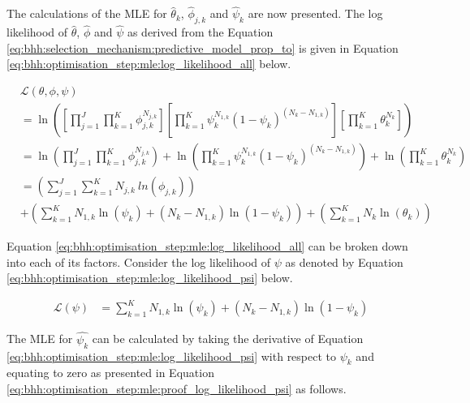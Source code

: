 The calculations of the \ac{MLE} for $\hat{\theta}_{k}$, $\hat{\phi}_{j,k}$ and
$\hat{\psi}_{k}$ are now presented. The log likelihood of $\hat{\theta}$, $\hat{\phi}$ and $\hat{\psi}$ as derived
from the Equation \ref{eq:bhh:selection_mechanism:predictive_model_prop_to} is given in Equation \ref{eq:bhh:optimisation_step:mle:log_likelihood_all} below.

\begin{equation}
    \label{eq:bhh:optimisation_step:mle:log_likelihood_all}
    \begin{split}
        & \mathcal{L}(\theta, \phi, \psi) \\
        &= \ln\left(\left[ \prod_{j=1}^{J} \prod_{k=1}^{K} \phi_{j,k}^{N_{j,k}} \right] \left[ \prod_{k=1}^{K} \psi_{k}^{N_{1,k}} (1 - \psi_{k})^{(N_{k} - N_{1,k})} \right] \left[ \prod_{k=1}^{K} \theta_{k}^{N_{k}} \right] \right) \\
        &= \ln \left( \prod_{j=1}^{J} \prod_{k=1}^{K} \phi_{j,k}^{N_{j,k}} \right) +  \ln \left( \prod_{k=1}^{K} \psi_{k}^{N_{1,k}} (1 - \psi_{k})^{(N_{k} - N_{1,k})} \right) + \ln \left( \prod_{k=1}^{K} \theta_{k}^{N_{k}} \right) \\		
        &= \left( \sum_{j=1}^{J} \sum_{k=1}^{K} N_{j,k} \ ln \left( \phi_{j,k}
        \right) \right) \\
        &+ \left( \sum_{k=1}^{K} N_{1,k} \ln \left( \psi_{k} \right) + \left( N_{k} - N_{1,k} \right) \ln \left( 1 - \psi_{k} \right) \right) + \left( \sum_{k=1}^{K} N_{k} \ln \left( \theta_{k} \right) \right)
    \end{split}
\end{equation}

Equation \ref{eq:bhh:optimisation_step:mle:log_likelihood_all} can be broken down into each of its factors. Consider the log likelihood of $\psi$  as denoted by Equation \ref{eq:bhh:optimisation_step:mle:log_likelihood_psi} below.

\begin{equation}
    \label{eq:bhh:optimisation_step:mle:log_likelihood_psi}
    \begin{split}
        \mathcal{L}(\psi) &=  \sum_{k=1}^{K} N_{1,k} \ln \left( \psi_{k} \right) + \left( N_{k} - N_{1,k} \right) \ln \left( 1 - \psi_{k} \right)
    \end{split}
\end{equation}

The MLE for $\hat{\psi_{k}} $ can be calculated by taking the derivative of Equation \ref{eq:bhh:optimisation_step:mle:log_likelihood_psi} with respect to $\psi_{k}$ and equating to zero as presented in Equation \ref{eq:bhh:optimisation_step:mle:proof_log_likelihood_psi} as follows.

